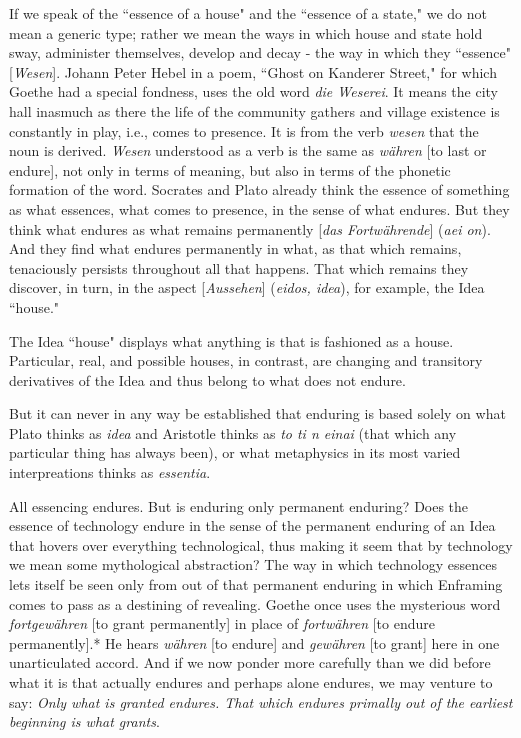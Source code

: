 If we speak of the ``essence of a house" and the ``essence of a state," we do not mean a generic type; rather we mean the ways in which house and state hold sway, administer themselves, develop and decay - the way in which they ``essence" [\textit{Wesen}]. Johann Peter Hebel in a poem, ``Ghost on Kanderer Street," for which Goethe had a special fondness, uses the old word \textit{die Weserei}. It means the city hall inasmuch as there the life of the community gathers and village existence is constantly in play, i.e., comes to presence. It is from the verb \textit{wesen} that the noun is derived. \textit{Wesen} understood as a verb is the same as \textit{w\"{a}hren} [to last or endure], not only in terms of meaning, but also in terms of the phonetic formation of the word. Socrates and Plato already think the essence of something as what essences, what comes to presence, in the sense of what endures. But they think what endures as what remains permanently [\textit{das Fortw\"{a}hrende}] (\textit{aei on}). And they find what endures permanently in what, as that which remains, tenaciously persists throughout all that happens. That which remains they discover, in turn, in the aspect [\textit{Aussehen}] (\textit{eidos, idea}), for example, the Idea ``house."

The Idea ``house" displays what anything is that is fashioned as a house. Particular, real, and possible houses, in contrast, are changing and transitory derivatives of the Idea and thus belong to what does not endure.

But it can never in any way be established that enduring is based solely on what Plato thinks as \textit{idea} and Aristotle thinks as \textit{to ti n einai} (that which any particular thing has always been), or what metaphysics in its most varied interpreations thinks as \textit{essentia}.

All essencing endures. But is enduring only permanent enduring? Does the essence of technology endure in the sense of the permanent enduring of an Idea that hovers over everything technological, thus making it seem that by technology we mean some mythological abstraction? The way in which technology essences lets itself be seen only from out of that permanent enduring in which Enframing comes to pass as a destining of revealing. Goethe once uses the mysterious word \textit{fortgew\"{a}hren} [to grant permanently] in place of \textit{fortw\"{a}hren} [to endure permanently].* He hears \textit{w\"{a}hren} [to endure] and \textit{gew\"{a}hren} [to grant] here in one unarticulated accord. And if we now ponder more carefully than we did before what it is that actually endures and perhaps alone endures, we may venture to say: \textit{Only what is granted endures. That which endures primally out of the earliest beginning is what grants}. 


